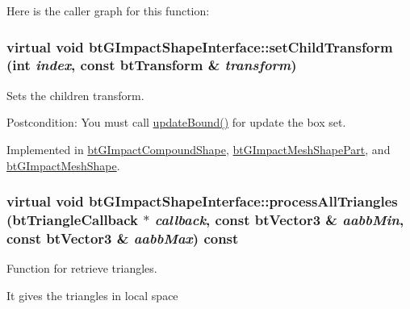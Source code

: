 Here is the caller graph for this function:\hypertarget{classbt_g_impact_shape_interface_83392f97bd7dfeb71ccdce6913a465b0}{
\subsubsection[setChildTransform]{\setlength{\rightskip}{0pt plus 5cm}virtual void btGImpactShapeInterface::setChildTransform (int {\em index}, \/  const btTransform \& {\em transform})}}
\label{classbt_g_impact_shape_interface_83392f97bd7dfeb71ccdce6913a465b0}


Sets the children transform. 

\begin{Desc}
\item[Postcondition:]You must call \hyperlink{classbt_g_impact_shape_interface_cb26c2d7a2aecabd06b996b72b848492}{updateBound()} for update the box set. \end{Desc}


Implemented in \hyperlink{classbt_g_impact_compound_shape_560410e20842ad73227d7712a574385c}{btGImpactCompoundShape}, \hyperlink{classbt_g_impact_mesh_shape_part_0a97d3769fb7d3f583e41da6b284bcc1}{btGImpactMeshShapePart}, and \hyperlink{classbt_g_impact_mesh_shape_274feed3c9a38a6af5c9f1141ae9ac1a}{btGImpactMeshShape}.\hypertarget{classbt_g_impact_shape_interface_2faf9adce39854a9a66dd658f646be25}{
\subsubsection[processAllTriangles]{\setlength{\rightskip}{0pt plus 5cm}virtual void btGImpactShapeInterface::processAllTriangles ({\bf btTriangleCallback} $\ast$ {\em callback}, \/  const btVector3 \& {\em aabbMin}, \/  const btVector3 \& {\em aabbMax}) const}}
\label{classbt_g_impact_shape_interface_2faf9adce39854a9a66dd658f646be25}


Function for retrieve triangles. 

It gives the triangles in local space 

